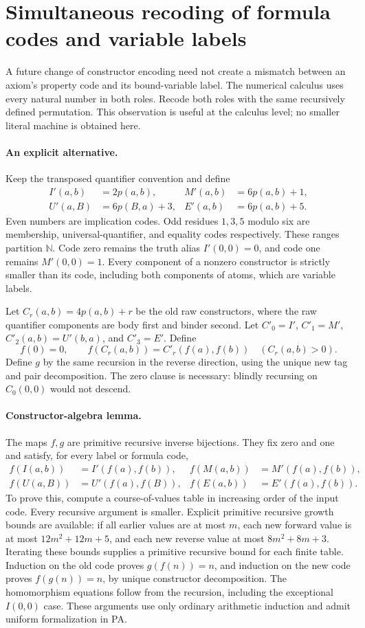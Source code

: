 \section{Simultaneous recoding of formula codes and variable labels}
A future change of constructor encoding need not create a mismatch between
an axiom's property code and its bound-variable label. The numerical
calculus uses every natural number in both roles. Recode both roles with the
same recursively defined permutation. This observation is useful at the
calculus level; no smaller literal machine is obtained here.

\paragraph{An explicit alternative.}
Keep the transposed quantifier convention and define
\[
\begin{aligned}
 I'(a,b)&=2p(a,b),&M'(a,b)&=6p(a,b)+1,\\
 U'(a,B)&=6p(B,a)+3,&E'(a,b)&=6p(a,b)+5.
\end{aligned}
\]
Even numbers are implication codes. Odd residues $1,3,5$ modulo six are
membership, universal-quantifier, and equality codes respectively. These
ranges partition $\mathbb N$. Code zero remains the truth alias
$I'(0,0)=0$, and code one remains $M'(0,0)=1$. Every component of a nonzero
constructor is strictly smaller than its code, including both components
of atoms, which are variable labels.

Let $C_r(a,b)=4p(a,b)+r$ be the old raw constructors, where the raw
quantifier components are body first and binder second. Let $C'_0=I'$,
$C'_1=M'$, $C'_2(a,b)=U'(b,a)$, and $C'_3=E'$. Define
\[
 f(0)=0,\qquad
 f(C_r(a,b))=C'_r(f(a),f(b))\quad(C_r(a,b)>0).
\]
Define $g$ by the same recursion in the reverse direction, using the unique
new tag and pair decomposition. The zero clause is necessary: blindly
recursing on $C_0(0,0)$ would not descend.

\paragraph{Constructor-algebra lemma.}
The maps $f,g$ are primitive recursive inverse bijections. They fix zero and
one and satisfy, for every label or formula code,
\[
\begin{aligned}
 f(I(a,b))&=I'(f(a),f(b)),&
f(M(a,b))&=M'(f(a),f(b)),\\
 f(U(a,B))&=U'(f(a),f(B)),&
f(E(a,b))&=E'(f(a),f(b)).
\end{aligned}
\]
To prove this, compute a course-of-values table in increasing order of the
input code. Every recursive argument is smaller. Explicit primitive
recursive growth bounds are available: if all earlier values are at most
$m$, each new forward value is at most $12m^2+12m+5$, and each new reverse
value at most $8m^2+8m+3$. Iterating these bounds supplies a primitive
recursive bound for each finite table. Induction on the old code proves
$g(f(n))=n$, and induction on the new code proves $f(g(n))=n$, by unique
constructor decomposition. The homomorphism equations follow from the
recursion, including the exceptional $I(0,0)$ case. These arguments use only
ordinary arithmetic induction and admit uniform formalization in PA.

